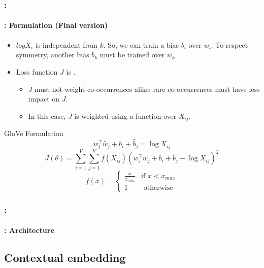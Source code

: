 \documentclass[xcolor=table]{beamer}
\begin{document}
\begin{frame}
	\frametitle{\insertshortsubtitle: \insertsection}
	\framesubtitle{\insertsubsection: Formulation (Final version)}
	
	\begin{itemize}
		\item $log X_i$ is independent from $k$. 
		So, we can train a bias $b_i$ over $w_i$. 
		To respect symmetry, another bias $\tilde{b_k}$ must be trained over $\tilde{w_k}$.
		\item Loss function $J$ is .
		\begin{itemize}
			\item $J$ must not weight co-occurrences alike: rare co-occurrences must have less impact on $J$.
			\item In this case, $J$ is weighted using a function over $X_{ij}$.
		\end{itemize}
	\end{itemize}
	
	\vskip-2pt\begin{block}{GloVe Formulation}\vskip-2pt
		\[w_i^\top \tilde{w_j} + b_i + \tilde{b_j} = \log X_{ij} \]
		\[J(\theta) = \sum_{i=1}^{V} \sum_{j=1}^{V} f(X_{ij}) (w_i^\top \tilde{w_j} + b_i + \tilde{b_j} - \log X_{ij})^2\]
		\vskip-2pt\[f(x) = \begin{cases}
		\frac{x}{x_{max}} & \text{if } x < x_{max} \\
		1 & \text{ otherwise}
		\end{cases}\]
	\end{block}
	
\end{frame}

\begin{frame}
	\frametitle{\insertshortsubtitle: \insertsection}
	\framesubtitle{\insertsubsection: Architecture}
	
	\begin{center}
	\end{center}
	
\end{frame}

\subsection{Contextual embedding}
\end{document}
